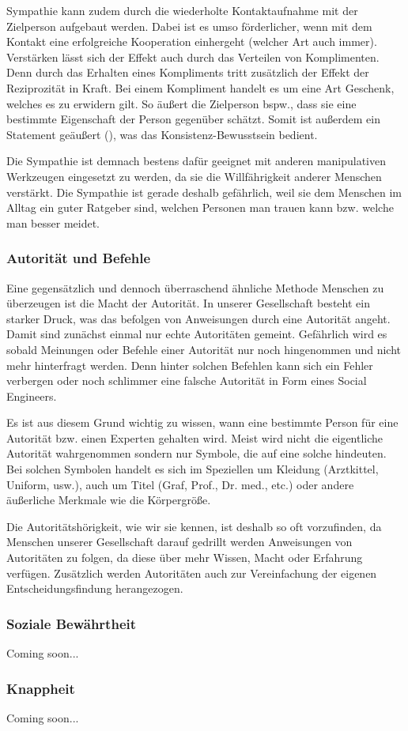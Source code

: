Sympathie kann zudem durch die wiederholte Kontaktaufnahme mit der Zielperson aufgebaut werden. Dabei ist es umso förderlicher, wenn mit dem Kontakt eine erfolgreiche Kooperation einhergeht (welcher Art auch immer). Verstärken lässt sich der Effekt auch durch das Verteilen von Komplimenten. Denn durch das Erhalten eines Kompliments tritt zusätzlich der Effekt der Reziprozität in Kraft. Bei einem Kompliment handelt es um eine Art Geschenk, welches es zu erwidern gilt. So äußert die Zielperson bspw., dass sie eine bestimmte Eigenschaft der Person gegenüber schätzt. Somit ist außerdem ein Statement geäußert (), was das Konsistenz-Bewusstsein bedient.

Die Sympathie ist demnach bestens dafür geeignet mit anderen manipulativen Werkzeugen eingesetzt zu werden, da sie die Willfährigkeit anderer Menschen verstärkt. Die Sympathie ist gerade deshalb gefährlich, weil sie dem Menschen im Alltag ein guter Ratgeber sind, welchen Personen man trauen kann bzw. welche man besser meidet. \citep{cialdini}

\subsubsection{Autorität und Befehle}\label{sec:autorität-und-befehle}
Eine gegensätzlich und dennoch überraschend ähnliche Methode Menschen zu überzeugen ist die Macht der Autorität. In unserer Gesellschaft besteht ein starker Druck, was das befolgen von Anweisungen durch eine Autorität angeht. Damit sind zunächst einmal nur echte Autoritäten gemeint. Gefährlich wird es sobald Meinungen oder Befehle einer Autorität nur noch hingenommen und nicht mehr hinterfragt werden. Denn hinter solchen Befehlen kann sich ein Fehler verbergen oder noch schlimmer eine falsche Autorität in Form eines Social Engineers.

Es ist aus diesem Grund wichtig zu wissen, wann eine bestimmte Person für eine Autorität bzw. einen Experten gehalten wird. Meist wird nicht die eigentliche Autorität wahrgenommen sondern nur Symbole, die auf eine solche hindeuten. Bei solchen Symbolen handelt es sich im Speziellen um Kleidung (Arztkittel, Uniform, usw.), auch um Titel (Graf, Prof., Dr. med., etc.) oder andere äußerliche Merkmale wie die Körpergröße.

Die Autoritätshörigkeit, wie wir sie kennen, ist deshalb so oft vorzufinden, da Menschen unserer Gesellschaft darauf gedrillt werden Anweisungen von Autoritäten zu folgen, da diese über mehr Wissen, Macht oder Erfahrung verfügen. Zusätzlich werden Autoritäten auch zur Vereinfachung der eigenen Entscheidungsfindung herangezogen. \citep{cialdini}

\subsubsection{Soziale Bewährtheit}\label{sec:soziale-bewährtheit}
Coming soon...
\citep{cialdini}

\subsubsection{Knappheit}\label{sec:knappheit}
Coming soon...
\citep{cialdini}
